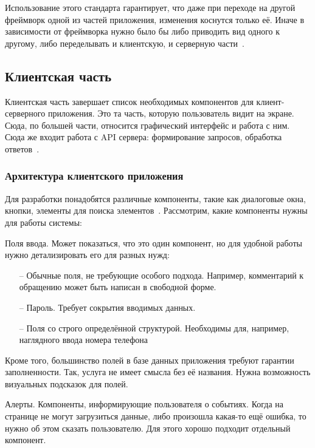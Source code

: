 \documentclass[a4paper,article]{article}
\begin{document}
\begin{sloppypar}
    Использование этого стандарта гарантирует, что даже при переходе на другой фреймворк одной из частей приложения, изменения коснутся только её. Иначе в зависимости от фреймворка нужно было бы либо приводить вид одного к другому, либо переделывать и клиентскую, и серверную части~\cite{httpstatus}.

    \newpage

    \subsection{Клиентская часть}

    Клиентская часть завершает список необходимых компонентов для клиент-серверного приложения. Это та часть, которую пользователь видит на экране. Сюда, по большей части, относится графический интерфейс и работа с ним. Сюда же входит работа с API сервера: формирование запросов, обработка ответов~\cite{baeldungbook, webapi}.

    \subsubsection{Архитектура клиентского приложения}

    Для разработки понадобятся различные компоненты, такие как диалоговые окна, кнопки, элементы для поиска элементов~\cite{vuejs}. Рассмотрим, какие компоненты нужны для работы системы:

    Поля ввода. Может показаться, что это один компонент, но для удобной работы нужно детализировать его для разных нужд:

    \begin{itemize}[nolistsep]
        \item[--] Обычные поля, не требующие особого подхода. Например, комментарий к обращению может быть написан в свободной форме.
        \item[--] Пароль. Требует сокрытия вводимых данных.
        \item[--] Поля со строго определённой структурой. Необходимы для, например, наглядного ввода номера телефона
    \end{itemize}

    Кроме того, большинство полей в базе данных приложения требуют гарантии заполненности. Так, услуга не имеет смысла без её названия. Нужна возможность визуальных подсказок для полей.

    Алерты. Компоненты, информирующие пользователя о событиях. Когда на странице не могут загрузиться данные, либо произошла какая-то ещё ошибка, то нужно об этом сказать пользователю. Для этого хорошо подходит отдельный компонент.


\end{sloppypar}
\end{document}

